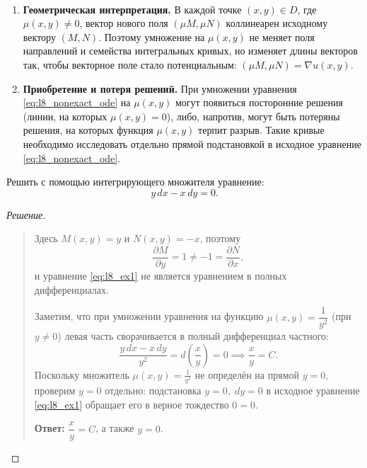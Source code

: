 \begin{remark} ~
    \begin{enumerate}
        \item \textbf{Геометрическая интерпретация.} В каждой точке
        $(x, y) \in D$, где $\mu(x, y) \neq 0$, вектор нового поля
        $(\mu M, \mu N)$ коллинеарен исходному вектору $(M, N)$. Поэтому
        умножение на $\mu(x, y)$ не меняет поля направлений и семейства
        интегральных кривых, но изменяет длины векторов так, чтобы векторное
        поле стало потенциальным: $(\mu M, \mu N) = \nabla u(x, y)$.
        \item \textbf{Приобретение и потеря решений.} При умножении уравнения
        \eqref{eq:l8_nonexact_ode} на $\mu(x, y)$ могут появиться посторонние
        решения (линии, на которых $\mu(x, y) = 0$), либо, напротив, могут
        быть потеряны решения, на которых функция $\mu(x, y)$ терпит разрыв.
        Такие кривые необходимо исследовать отдельно прямой подстановкой в
        исходное уравнение \eqref{eq:l8_nonexact_ode}.
    \end{enumerate}
\end{remark}

\begin{example}
    Решить с помощью интегрирующего множителя уравнение:
    \begin{equation} \label{eq:l8_ex1}
        y \, dx - x \, dy = 0. \tag{4}
    \end{equation}

    \begin{proof}[Решение]~\\
        \begin{quote}
            Здесь $M(x, y) = y$ и $N(x, y) = -x$, поэтому
            \[
                \frac{\partial M}{\partial y} = 1 \neq -1 =
                \frac{\partial N}{\partial x},
            \]
            и уравнение \eqref{eq:l8_ex1} не является уравнением в полных
            дифференциалах.

            Заметим, что при умножении уравнения на функцию
            $\mu(x, y) = \dfrac{1}{y^2}$ (при $y \neq 0$) левая часть
            сворачивается в полный дифференциал частного:
            \[
                \frac{y \, dx - x \, dy}{y^2} = d\left(\frac{x}{y}\right) = 0
                \implies \frac{x}{y} = C.
            \]
            Поскольку множитель $\mu(x, y) = \frac{1}{y^2}$ не определён на
            прямой $y = 0$, проверим $y = 0$ отдельно: подстановка $y = 0, \;
            dy = 0$ в исходное уравнение \eqref{eq:l8_ex1} обращает его в
            верное тождество $0 = 0$.

            \textbf{Ответ:} $\dfrac{x}{y} = C$, а также $y = 0$.
        \end{quote}
    \end{proof}
    
\end{example}

